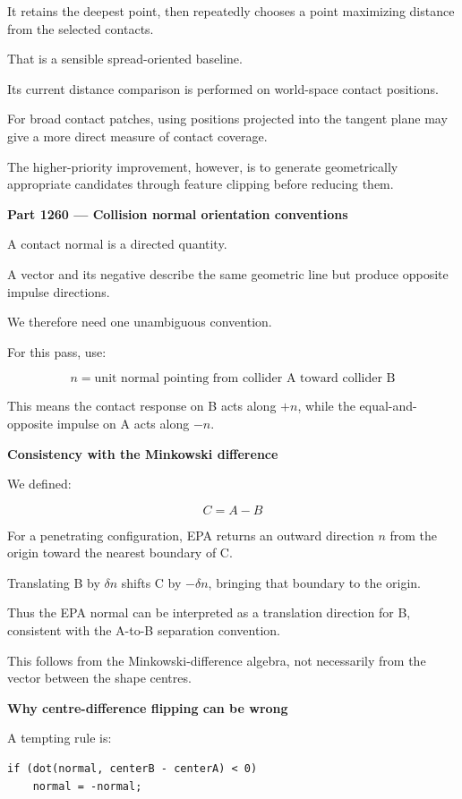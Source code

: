 It retains the deepest point, then repeatedly chooses a point maximizing distance from the selected contacts.

That is a sensible spread-oriented baseline.

Its current distance comparison is performed on world-space contact positions.

For broad contact patches, using positions projected into the tangent plane may give a more direct measure of contact coverage.

The higher-priority improvement, however, is to generate geometrically appropriate candidates through feature clipping before reducing them.

\textbf{Part 1260 --- Collision normal orientation conventions}

A contact normal is a directed quantity.

A vector and its negative describe the same geometric line but produce opposite impulse directions.

We therefore need one unambiguous convention.

For this pass, use:

\[
\boxed{ n=\text{unit normal pointing from collider A toward collider B} }
\]

This means the contact response on B acts along \(+n\), while the equal-and-opposite impulse on A acts along \(-n\).

\textbf{Consistency with the Minkowski difference}

We defined:

\[
C=A-B
\]

For a penetrating configuration, EPA returns an outward direction \(n\) from the origin toward the nearest boundary of C.

Translating B by \(\delta n\) shifts C by \(-\delta n\), bringing that boundary to the origin.

Thus the EPA normal can be interpreted as a translation direction for B, consistent with the A-to-B separation convention.

This follows from the Minkowski-difference algebra, not necessarily from the vector between the shape centres.

\textbf{Why centre-difference flipping can be wrong}

A tempting rule is:

\begin{verbatim}
if (dot(normal, centerB - centerA) < 0)
    normal = -normal;
\end{verbatim}

